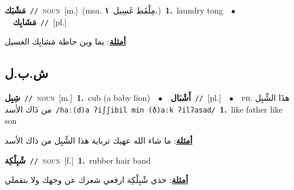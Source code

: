 \documentclass[10pt,a4paper,twoside]{article} %
\begin{document}
\begin{multicols}{2}
{\setlength\topsep{0pt}\textbf{\foreignlanguage{arabic}{مَشْبَك}}\ {\color{gray}\texttt{//}\color{black}}\ \textsc{noun}\ [m.]\ \color{gray}(msa. \foreignlanguage{arabic}{مِلْقَط غَسِيل}~\foreignlanguage{arabic}{\textbf{١.}})\color{black}\ \textbf{1.}~laundry tong\ \ $\bullet$\ \ \setlength\topsep{0pt}\textbf{\foreignlanguage{arabic}{مَشَابِك}}\ {\color{gray}\texttt{//}\color{black}}\ [pl.]\  \begin{flushright}\color{gray}\foreignlanguage{arabic}{\textbf{\underline{\foreignlanguage{arabic}{أمثلة}}}: يما وين حاطة مَشابِك الغسيل}\end{flushright}\color{black}} \vspace{2mm}

\vspace{-3mm}
\subsection*{\color{blue}\foreignlanguage{arabic}{ش.ب.ل}\color{blue}{}} 

{\setlength\topsep{0pt}\textbf{\foreignlanguage{arabic}{شِبِل}}\ {\color{gray}\texttt{//}\color{black}}\ \textsc{noun}\ [m.]\ \textbf{1.}~cub (a baby lion)\ \ $\bullet$\ \ \setlength\topsep{0pt}\textbf{\foreignlanguage{arabic}{أَشْبَال}}\ {\color{gray}\texttt{//}\color{black}}\ [pl.]\ \ $\bullet$\ \ \textsc{ph.} \color{gray} \foreignlanguage{arabic}{هذَا الشِّبِل من ذَاك الأسد}\color{black}\ {\color{gray}\texttt{/{\sffamily haː(d)a ʔiʃʃibil min (ð)aːk ʔilʔasad}/}\color{black}}\ \textbf{1.}~like father like son\  \begin{flushright}\color{gray}\foreignlanguage{arabic}{\textbf{\underline{\foreignlanguage{arabic}{أمثلة}}}: ما شاء الله عهيك ترباية هذا الشِّبِل من ذاك الأسد}\end{flushright}\color{black}} \vspace{2mm}

{\setlength\topsep{0pt}\textbf{\foreignlanguage{arabic}{شْبِلْكِة}}\ {\color{gray}\texttt{//}\color{black}}\ \textsc{noun}\ [f.]\ \textbf{1.}~rubber hair band\  \begin{flushright}\color{gray}\foreignlanguage{arabic}{\textbf{\underline{\foreignlanguage{arabic}{أمثلة}}}: خذي شْبِلْكِة ارفعي شعرك عن وجهك ولا بتقملي}\end{flushright}\color{black}} \vspace{2mm}


\end{multicols}
\end{document}
